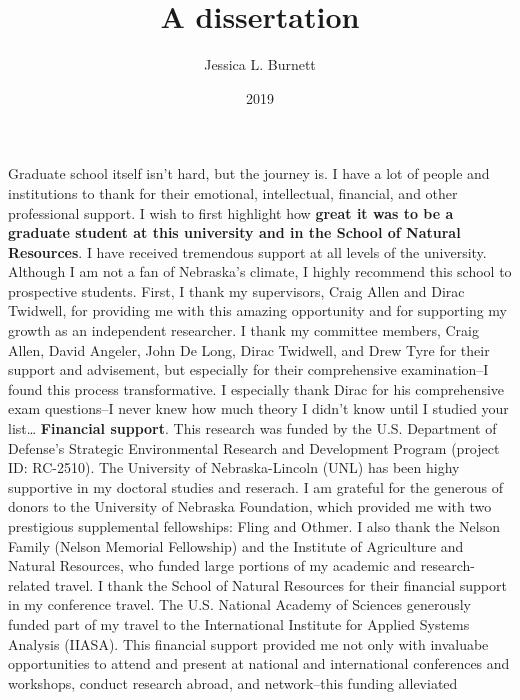 \documentclass[12pt,twoside]{reedthesis}
\title{A dissertation}
\author{Jessica L. Burnett}
\date{2019}
\begin{document}
  \maketitle

\frontmatter %
\pagestyle{empty} %
  \begin{acknowledgements}
    Graduate school itself isn't hard, but the journey is. I have a lot of
    people and institutions to thank for their emotional, intellectual,
    financial, and other professional support. I wish to first highlight how
    \textbf{great it was to be a graduate student at this university and in
    the School of Natural Resources}. I have received tremendous support at
    all levels of the university. Although I am not a fan of Nebraska's
    climate, I highly recommend this school to prospective students. First,
    I thank my supervisors, Craig Allen and Dirac Twidwell, for providing me
    with this amazing opportunity and for supporting my growth as an
    independent researcher. I thank my committee members, Craig Allen, David
    Angeler, John De Long, Dirac Twidwell, and Drew Tyre for their support
    and advisement, but especially for their comprehensive examination--I
    found this process transformative. I especially thank Dirac for his
    comprehensive exam questions--I never knew how much theory I didn't know
    until I studied your list\ldots{} \textbf{Financial support}. This
    research was funded by the U.S. Department of Defense's Strategic
    Environmental Research and Development Program (project ID: RC-2510).
    The University of Nebraska-Lincoln (UNL) has been highy supportive in my
    doctoral studies and reserach. I am grateful for the generous of donors
    to the University of Nebraska Foundation, which provided me with two
    prestigious supplemental fellowships: Fling and Othmer. I also thank the
    Nelson Family (Nelson Memorial Fellowship) and the Institute of
    Agriculture and Natural Resources, who funded large portions of my
    academic and research-related travel. I thank the School of Natural
    Resources for their financial support in my conference travel. The U.S.
    National Academy of Sciences generously funded part of my travel to the
    International Institute for Applied Systems Analysis (IIASA). This
    financial support provided me not only with invaluabe opportunities to
    attend and present at national and international conferences and
    workshops, conduct research abroad, and network--this funding alleviated

\end{acknowledgements}
\end{document}
